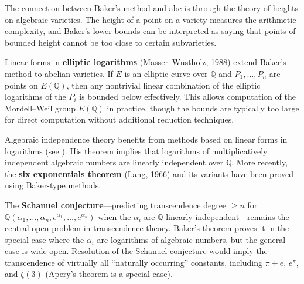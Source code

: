 The connection between Baker's method \cite{baker1966} and abc is through the theory of heights on algebraic varieties. The height of a point on a variety measures the arithmetic complexity, and Baker's lower bounds can be interpreted as saying that points of bounded height cannot be too close to certain subvarieties.

Linear forms in \textbf{elliptic logarithms} (Masser--W\"{u}stholz, 1988) extend Baker's method \cite{baker1966} to abelian varieties. If $E$ is an elliptic curve over $\mathbb{Q}$ and $P_1, \ldots, P_n$ are points on $E(\mathbb{Q})$, then any nontrivial linear combination of the elliptic logarithms of the $P_i$ is bounded below effectively. This allows computation of the Mordell--Weil group $E(\mathbb{Q})$ in practice, though the bounds are typically too large for direct computation without additional reduction techniques.

Algebraic independence theory benefits from methods based on linear forms in logarithms (see \cite{baker1966}). His theorem implies that logarithms of multiplicatively independent algebraic numbers are linearly independent over $\overline{\mathbb{Q}}$. More recently, the \textbf{six exponentials theorem} (Lang, 1966) and its variants have been proved using Baker-type methods.

The \textbf{Schanuel conjecture}---predicting transcendence degree $\geq n$ for $\mathbb{Q}(\alpha_1, \ldots, \alpha_n, e^{\alpha_1}, \ldots, e^{\alpha_n})$ when the $\alpha_i$ are $\mathbb{Q}$-linearly independent---remains the central open problem in transcendence theory. Baker's theorem proves it in the special case where the $\alpha_i$ are logarithms of algebraic numbers, but the general case is wide open. Resolution of the Schanuel conjecture would imply the transcendence of virtually all ``naturally occurring'' constants, including $\pi + e$, $e^\pi$, and $\zeta(3)$ (Apery's theorem is a special case).

